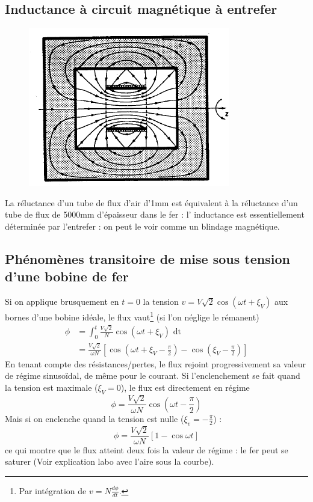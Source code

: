 	\subsection{Inductance à circuit magnétique à entrefer}
		\begin{figure}
		\vspace{-8mm}
		\includegraphics[scale=0.273]{ch3/image7.png}
		\end{figure}
	La réluctance d'un tube de flux d'air d'1mm est équivalent à la 
	réluctance d'un tube de flux de 5000mm d'épaisseur dans le fer : l'
	inductance est essentiellement déterminée par l'entrefer : on peut le 
	voir comme un blindage magnétique.\\
	
	
	\subsection{Phénomènes transitoire de mise sous tension d'une bobine 
	de fer}
	Si on applique brusquement en $t=0$ la tension $v=V\sqrt{2}\cos(\omega 
	t+\xi_V)$ aux bornes d'une bobine idéale, le flux vaut\footnote{Par 
	intégration de $v = N\frac{d\phi}{dt}$.} (si l'on néglige le rémanent)
	\begin{equation}
	\begin{array}{ll}
	\phi &= \int_0^t \frac{V\sqrt{2}}{N}\cos(\omega t + \xi_V)\text{ dt}\\
	 &= \frac{V\sqrt{2}}{\omega N}\left[\cos(\omega t + \xi_V - \frac{\pi}{2})
	 -\cos(\xi_V-\frac{\pi}{2})\right]
	\end{array}	
	\end{equation}
	En tenant compte des résistances/pertes, le flux rejoint progressivement 
	sa valeur de régime sinusoïdal, de même pour le courant. Si l'enclenchement 
	se fait quand la tension est maximale ($\xi_V=0$), le flux est directement 
	en régime
	\begin{equation}
	\phi = \frac{V\sqrt{2}}{\omega N}\cos\left(\omega t - \frac{\pi}{2}\right)
	\end{equation}	
	Mais si on enclenche quand la tension est nulle ($\xi_v = -\frac{\pi}{2}$) :
	\begin{equation}
	\phi = \frac{V\sqrt{2}}{\omega N}[1-\cos\omega t]
	\end{equation}
	ce qui montre que le flux atteint deux fois la valeur de régime : le fer 
	peut se saturer (Voir explication labo avec l'aire sous la courbe).

